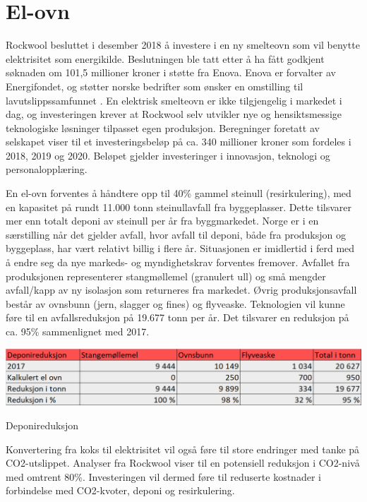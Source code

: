\section{El-ovn}
Rockwool besluttet i desember 2018 å investere i en ny smelteovn som vil benytte elektrisitet som energikilde. Beslutningen ble tatt etter å ha fått godkjent søknaden om 101,5 millioner kroner i støtte fra Enova. Enova er forvalter av Energifondet, og støtter norske bedrifter som ønsker en omstilling til lavutslippssamfunnet \cite{enova}. En elektrisk smelteovn er ikke tilgjengelig i markedet i dag, og investeringen krever at Rockwool selv utvikler nye og hensiktsmessige teknologiske løsninger tilpasset egen produksjon. Beregninger foretatt av selskapet viser til et investeringsbeløp på ca. 340 millioner kroner som fordeles i 2018, 2019 og 2020. Beløpet gjelder investeringer i innovasjon, teknologi og personalopplæring. 

\indent \newline
En el-ovn forventes å håndtere opp til 40\% gammel steinull (resirkulering), med en kapasitet på rundt 11.000 tonn steinullavfall fra byggeplasser. Dette tilsvarer mer enn totalt deponi av steinull per år fra byggmarkedet. Norge er i en særstilling når det gjelder avfall, hvor avfall til deponi, både fra produksjon og byggeplass, har vært relativt billig i flere år. Situasjonen er imidlertid i ferd med å endre seg da nye markeds- og myndighetskrav forventes fremover. Avfallet fra produksjonen representerer stangmøllemel (granulert ull) og små mengder avfall/kapp av ny isolasjon som returneres fra markedet. Øvrig produksjonsavfall består av ovnsbunn (jern, slagger og fines) og flyveaske. Teknologien vil kunne føre til en avfallsreduksjon på 19.677 tonn per år. Det tilsvarer en reduksjon på ca. 95\% sammenlignet med 2017.

\begin{table}[H]
  \includegraphics[width=\linewidth]{tabeller/deponireduksjon.png}
  \caption{Deponireduksjon}
  \label{tbl:deponireduksjon}
\end{table}

\indent \newline
Konvertering fra koks til elektrisitet vil også føre til store endringer med tanke på CO2-utslippet. Analyser fra Rockwool viser til en potensiell reduksjon i CO2-nivå med omtrent 80\%. Investeringen vil dermed føre til reduserte kostnader i forbindelse med CO2-kvoter, deponi og resirkulering. 

